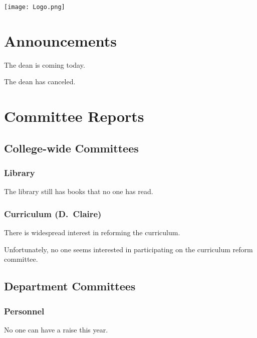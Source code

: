 \documentclass[11pt]{meetingmins}
\date{}
\begin{document}
\hspace*{-1cm}\texttt{[image: Logo.png]}
\maketitle

\section{Announcements}
\begin{hiddenitems}
\item
The dean is coming today.

\item
The dean has canceled.

\end{hiddenitems}

\section{Committee Reports}

\subsection{College-wide Committees}
\subsubsection{Library}
The library still has books that no one has read.

\subsubsection{Curriculum {\rm (D.~Claire)}}
\begin{hiddensubitems}
\item
There is widespread interest in reforming the curriculum.

\item
Unfortunately, no one seems interested in participating on the
curriculum reform committee.
\end{hiddensubitems}

\subsection{Department Committees}
\subsubsection{Personnel}
No one can have a raise this year.
\end{document}
